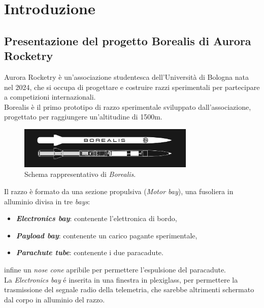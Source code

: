\documentclass[12pt,a4paper,twoside]{book}
\begin{document}
\setcounter{chapter}{0}
\raggedbottom
\chapter{Introduzione} \label{chap:intro}
\pagestyle{plain}
\setcounter{page}{1}

\section{Presentazione del progetto Borealis di Aurora Rocketry}
Aurora Rocketry è un'associazione studentesca dell'Università di Bologna nata
nel 2024, che si occupa di progettare e costruire razzi sperimentali per
partecipare a competizioni internazionali. \\
Borealis è il primo prototipo di razzo sperimentale sviluppato
dall'associazione, progettato per raggiungere un'altitudine di 1500m.

\begin{figure}[H]
    \centering
    \includegraphics[width=0.75\textwidth]{img/borealis-schema.png}
    \caption{Schema rappresentativo di \emph{Borealis}.}
    \label{fig:borealis-schema}
\end{figure}

Il razzo è formato da una sezione propulsiva (\emph{Motor bay}), una fusoliera
in alluminio divisa in tre \emph{bays}:
\begin{itemize}
    \item \textbf{\emph{Electronics bay}}: contenente l'elettronica di bordo,
    \item \textbf{\emph{Payload bay}}: contenente un carico pagante sperimentale,
    \item \textbf{\emph{Parachute tube}}: contenente i due paracadute.
\end{itemize}
infine un \emph{nose cone} apribile per permettere l'espulsione del paracadute.\\

La \emph{Electronics bay} \'e inserita in una finestra in plexiglass, per permettere
la trasmissione del segnale radio della telemetria, che sarebbe altrimenti schermato
dal corpo in alluminio del razzo. \\
\end{document}

